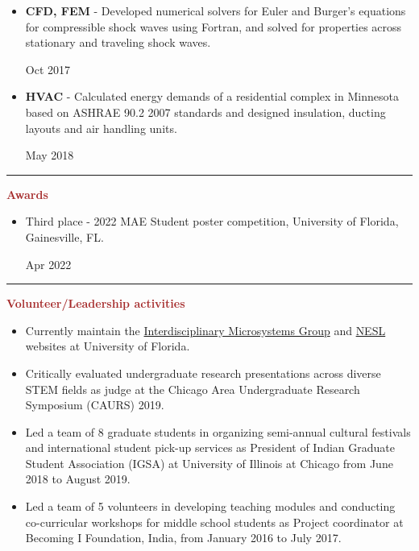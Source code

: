 \documentclass[11pt, letterpaper]{article}
\begin{document}
\begin{itemize}[leftmargin=*]
\setlength\itemsep{-2pt}
\vspace{-8pt}
\item \textbf{CFD, FEM} - Developed numerical solvers for Euler and Burger's equations for compressible shock waves using Fortran, and solved for properties across stationary and traveling shock waves. \hfill \raggedright{Oct 2017}
\item \textbf{HVAC} - Calculated energy demands of a residential complex in Minnesota based on ASHRAE 90.2 2007 standards and designed insulation, ducting layouts and air handling units. \hfill \raggedright{May 2018}
\end{itemize}
\vspace{-10pt}
\noindent \rule[2pt]{\textwidth}{0.5pt}
\noindent \textbf{\large \textcolor{Brown}{Awards}}\\
\begin{itemize}[leftmargin=*]
\setlength\itemsep{-1pt}
\vspace{-8pt}
\item Third place - 2022 MAE Student poster competition, University of Florida, Gainesville, FL. \hfill \raggedright{Apr 2022}
\end{itemize}
\vspace{-10pt}
\noindent \rule[2pt]{\textwidth}{0.5pt}
\noindent \textbf{\large \textcolor{Brown}{Volunteer/Leadership activities}}\\
\begin{itemize}[leftmargin=*]
\setlength\itemsep{-2pt}
\vspace{-8pt}
\item Currently maintain the \href{https://www.img.ufl.edu/}{Interdisciplinary Microsystems Group} and \href{https://mae.ufl.edu/neslabs/index.html}{NESL} websites at University of Florida.
\item Critically evaluated undergraduate research presentations across diverse STEM fields as judge at the Chicago Area Undergraduate Research Symposium (CAURS) 2019.
\item Led a team of 8 graduate students in organizing semi-annual cultural festivals and international student pick-up services as President of Indian Graduate Student Association (IGSA) at University of Illinois at Chicago from June 2018 to August 2019.
\item Led a team of 5 volunteers in developing teaching modules and conducting co-curricular workshops for middle school students as Project coordinator at Becoming I Foundation, India, from January 2016 to July 2017.
\end{itemize}
\end{document}
